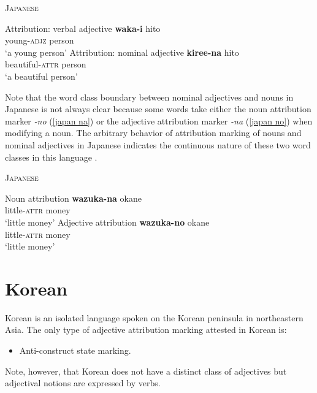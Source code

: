\begin{exe}
\ex \textsc{Japanese} \citep[72-81]{pustet1989}%
\begin{xlist}
\ex Attribution: verbal adjective
\gll	\textbf{waka-i} hito\\
	young-\textsc{adjz} person\\
\glt	‘a young person’
\ex Attribution: nominal adjective
\gll	\textbf{kiree-na} hito\\
	beautiful-\textsc{attr} person\\
\glt	‘a beautiful person’
\end{xlist}
\end{exe}
Note that the word class boundary between nominal adjectives and nouns in Japanese is not always clear because some words take either the noun attribution marker \textit{-no} (\ref{japan na}) or the adjective attribution marker \textit{-na} (\ref{japan no}) when modifying a noun. The arbitrary behavior of attribution marking of nouns and nominal adjectives in Japanese indicates the continuous nature of these two word classes in this language \citep[79-80]{pustet1989}.

\begin{exe}
\ex \textsc{Japanese} \citep[72-81]{pustet1989}%
\begin{xlist}
\ex Noun attribution \label{japan na}
\gll	\textbf{wazuka-na} okane\\
	little-\textsc{attr} money\\
\glt	‘little money’
\ex Adjective attribution \label{japan no}
\gll	\textbf{wazuka-no} okane\\
	little-\textsc{attr} money\\
\glt	‘little money’
\end{xlist}
\end{exe}

\section{Korean}
Korean is an isolated language spoken on the Korean peninsula in northeastern Asia. The only type of adjective attribution marking attested in Korean is:
\begin{itemize}
\item Anti-construct state marking.
\end{itemize}
Note, however, that Korean does not have a distinct class of adjectives but adjectival notions are expressed by verbs.


